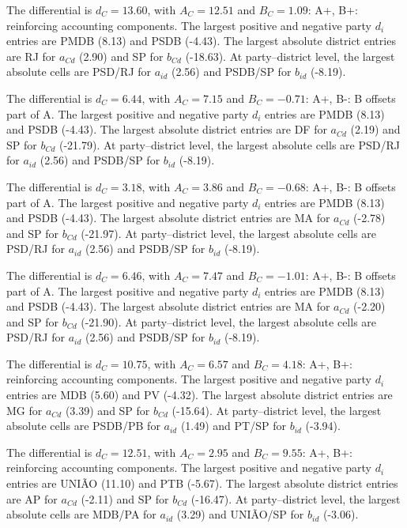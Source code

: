 \begin{description}[style=nextline,leftmargin=3em,labelindent=0pt]
The differential is \(d_C=13.60\), with \(A_C=12.51\) and \(B_C=1.09\): A+, B+: reinforcing accounting components. The largest positive and negative party \(d_i\) entries are PMDB (8.13) and PSDB (-4.43). The largest absolute district entries are RJ for \(a_{Cd}\) (2.90) and SP for \(b_{Cd}\) (-18.63). At party--district level, the largest absolute cells are PSD/RJ for \(a_{id}\) (2.56) and PSDB/SP for \(b_{id}\) (-8.19).
\item[\textbf{Ideological 2014/9-23 PT DO B-PSDC}]
The differential is \(d_C=6.44\), with \(A_C=7.15\) and \(B_C=-0.71\): A+, B-: B offsets part of A. The largest positive and negative party \(d_i\) entries are PMDB (8.13) and PSDB (-4.43). The largest absolute district entries are DF for \(a_{Cd}\) (2.19) and SP for \(b_{Cd}\) (-21.79). At party--district level, the largest absolute cells are PSD/RJ for \(a_{id}\) (2.56) and PSDB/SP for \(b_{id}\) (-8.19).
\item[\textbf{Ideological 2014/9-24 PT DO B-PSL}]
The differential is \(d_C=3.18\), with \(A_C=3.86\) and \(B_C=-0.68\): A+, B-: B offsets part of A. The largest positive and negative party \(d_i\) entries are PMDB (8.13) and PSDB (-4.43). The largest absolute district entries are MA for \(a_{Cd}\) (-2.78) and SP for \(b_{Cd}\) (-21.97). At party--district level, the largest absolute cells are PSD/RJ for \(a_{id}\) (2.56) and PSDB/SP for \(b_{id}\) (-8.19).
\item[\textbf{Ideological 2014/10-24 SOLIDARIEDADE-PSL}]
The differential is \(d_C=6.46\), with \(A_C=7.47\) and \(B_C=-1.01\): A+, B-: B offsets part of A. The largest positive and negative party \(d_i\) entries are PMDB (8.13) and PSDB (-4.43). The largest absolute district entries are MA for \(a_{Cd}\) (-2.20) and SP for \(b_{Cd}\) (-21.90). At party--district level, the largest absolute cells are PSD/RJ for \(a_{id}\) (2.56) and PSDB/SP for \(b_{id}\) (-8.19).
\item[\textbf{Ideological 2018/3-16 PT-PSDB}]
The differential is \(d_C=10.75\), with \(A_C=6.57\) and \(B_C=4.18\): A+, B+: reinforcing accounting components. The largest positive and negative party \(d_i\) entries are MDB (5.60) and PV (-4.32). The largest absolute district entries are MG for \(a_{Cd}\) (3.39) and SP for \(b_{Cd}\) (-15.64). At party--district level, the largest absolute cells are PSDB/PB for \(a_{id}\) (1.49) and PT/SP for \(b_{id}\) (-3.94).
\item[\textbf{Ideological 2022/11-20 MDB-UNIÃO}]
The differential is \(d_C=12.51\), with \(A_C=2.95\) and \(B_C=9.55\): A+, B+: reinforcing accounting components. The largest positive and negative party \(d_i\) entries are UNIÃO (11.10) and PTB (-5.67). The largest absolute district entries are AP for \(a_{Cd}\) (-2.11) and SP for \(b_{Cd}\) (-16.47). At party--district level, the largest absolute cells are MDB/PA for \(a_{id}\) (3.29) and UNIÃO/SP for \(b_{id}\) (-3.06).

\end{description}
